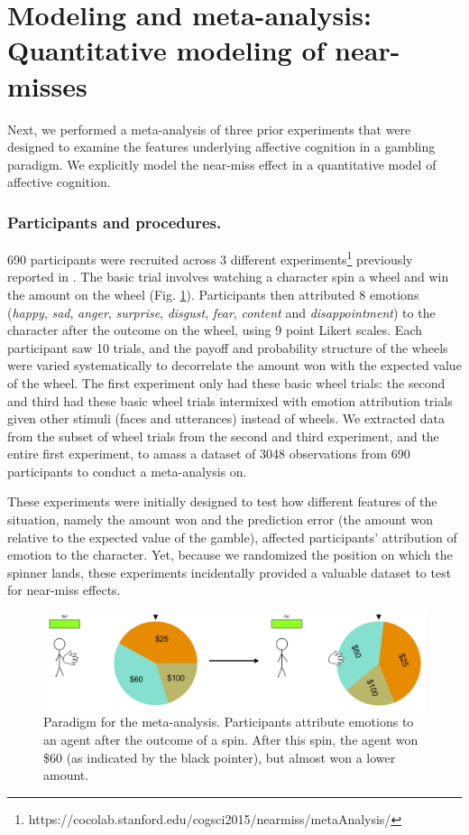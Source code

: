 \documentclass[10pt,letterpaper]{article}
\begin{document}



\section{Modeling and meta-analysis: Quantitative modeling of near-misses}
	Next, we performed a meta-analysis of three prior experiments that were designed to examine the features underlying affective cognition in a gambling paradigm. We explicitly model the near-miss effect in a quantitative model of affective cognition.
	
\subsubsection{Participants and procedures.}
	690 participants were recruited across 3 different experiments\footnote{https://cocolab.stanford.edu/cogsci2015/nearmiss/metaAnalysis/} previously reported in . The basic trial involves watching a character spin a wheel and win the amount on the wheel (Fig. \ref{Expt3ParadigmFig}). Participants then attributed 8 emotions (\textit{happy}, \textit{sad}, \textit{anger}, \textit{surprise}, \textit{disgust}, \textit{fear}, \textit{content} and \textit{disappointment}) to the character after the outcome on the wheel, using 9 point Likert scales. Each participant saw 10 trials, and the payoff and probability structure of the wheels were varied systematically to decorrelate the amount won with the expected value of the wheel. The first experiment only had these basic wheel trials: the second and third had these basic wheel trials intermixed with emotion attribution trials given other stimuli (faces and utterances) instead of wheels. We extracted data from the subset of wheel trials from the second and third experiment, and the entire first experiment, to amass a dataset of 3048 observations from 690 participants to conduct a meta-analysis on.
	
	These experiments were initially designed to test how different features of the situation, namely the amount won and the prediction error (the amount won relative to the expected value of the gamble), affected participants' attribution of emotion to the character. Yet, because we randomized the position on which the spinner lands, these experiments incidentally provided a valuable dataset to test for near-miss effects.

\begin{figure}[htb!]
\includegraphics[width=\columnwidth]{images/expt3Paradigm.png}
\caption{ Paradigm for the meta-analysis. Participants attribute emotions to an agent after the outcome of a spin. After this spin, the agent won \$60 (as indicated by the black pointer), but almost won a lower amount. }
\label{Expt3ParadigmFig}
\end{figure}
\end{document}
